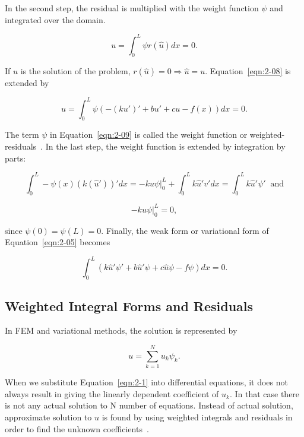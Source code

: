 \noindent In the second step, the residual is multiplied with the weight function $\psi$ and integrated over the domain.

\begin{equation}
u = \int_{0}^L \psi r(\hat{u}) dx = 0.
\label{eqn:2-08}
\end{equation}

\noindent If $\hat{u}$ is the solution of the problem, $r(\hat{u})=0 \Rightarrow \hat{u} = u$.
Equation~\ref{eqn:2-08} is extended by

\begin{equation}
u = \int_{0}^L \psi (-(ku')' + bu' + cu - f(x)) dx = 0.
\label{eqn:2-09}
\end{equation}

\noindent The term $\psi$ in Equation~\ref{eqn:2-09} is called the weight function or weighted-residuals~\cite{Reddy93}.
In the last step, the weight function is extended by integration by parts:

\begin{equation}
\int_{0}^L -\psi(x) (k(\hat{u}'))' dx = -ku\psi |^L_{0} + \int_{0}^L k \hat{u}' v' dx = \int_{0}^L k \hat{u}' \psi' \;\;\text{and}
\label{eqn:2-010}
\end{equation}

\begin{equation}
-ku\psi |^L_{0} = 0,
\label{eqn:2-011}
\end{equation}

\noindent since $\psi(0) = \psi(L) = 0$. Finally, the weak form or variational form of Equation~\ref{eqn:2-05} becomes

\begin{equation}
\int_{0}^L (k \hat{u}'\psi' + b\hat{u}'\psi + c\hat{u}\psi - f\psi) dx = 0.
\label{eqn:2-012}
\end{equation}


\subsection{Weighted Integral Forms and Residuals}

In FEM and variational methods, the solution is represented by

\begin{equation}
u = \sum\limits_{k=1}^N u_{k} \psi_{k}.
\label{eqn:2-1}
\end{equation}

\noindent When we substitute Equation~\ref{eqn:2-1} into differential equations, it does not always result in giving the linearly dependent coefficient of $u_{k}$. In that case there is not any actual solution to N number of equations. Instead of actual solution, approximate solution to $u$ is found by using weighted integrals and residuals in order to find the unknown coefficients~\cite{Reddy93}.

